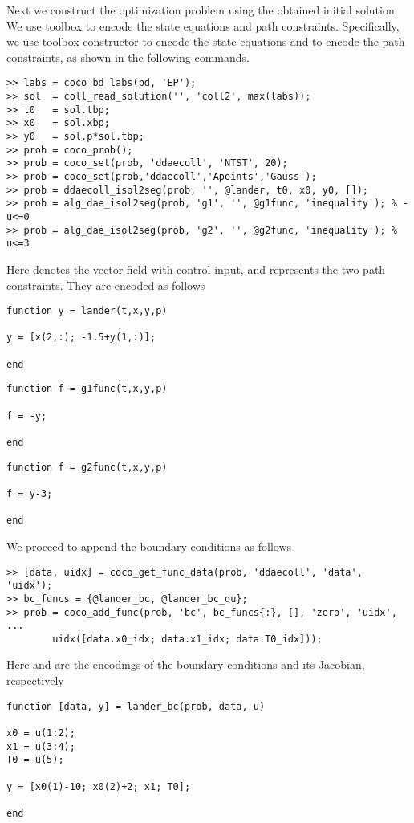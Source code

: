 Next we construct the optimization problem using the obtained initial solution. We use  toolbox to encode the state equations and path constraints. Specifically, we use  toolbox constructor to encode the state equations and  to encode the path constraints, as shown in the following commands.
\begin{lstlisting}[language=coco-highlight]
>> labs = coco_bd_labs(bd, 'EP');
>> sol  = coll_read_solution('', 'coll2', max(labs));
>> t0   = sol.tbp;
>> x0   = sol.xbp;
>> y0   = sol.p*sol.tbp;
>> prob = coco_prob();
>> prob = coco_set(prob, 'ddaecoll', 'NTST', 20);
>> prob = coco_set(prob,'ddaecoll','Apoints','Gauss');
>> prob = ddaecoll_isol2seg(prob, '', @lander, t0, x0, y0, []); 
>> prob = alg_dae_isol2seg(prob, 'g1', '', @g1func, 'inequality'); % -u<=0
>> prob = alg_dae_isol2seg(prob, 'g2', '', @g2func, 'inequality'); % u<=3
\end{lstlisting}
Here  denotes the vector field with control input,  and  represents the two path constraints. They are encoded as follows
\begin{lstlisting}[language=coco-highlight]
function y = lander(t,x,y,p)

y = [x(2,:); -1.5+y(1,:)];

end
\end{lstlisting}
\begin{lstlisting}[language=coco-highlight]
function f = g1func(t,x,y,p)

f = -y;

end
\end{lstlisting}
\begin{lstlisting}[language=coco-highlight]
function f = g2func(t,x,y,p)

f = y-3;

end
\end{lstlisting}
We proceed to append the boundary conditions as follows
\begin{lstlisting}[language=coco-highlight]
>> [data, uidx] = coco_get_func_data(prob, 'ddaecoll', 'data', 'uidx');
>> bc_funcs = {@lander_bc, @lander_bc_du};
>> prob = coco_add_func(prob, 'bc', bc_funcs{:}, [], 'zero', 'uidx', ...
        uidx([data.x0_idx; data.x1_idx; data.T0_idx]));
\end{lstlisting}
Here  and  are the encodings of the boundary conditions and its Jacobian, respectively
\begin{lstlisting}[language=coco-highlight]
function [data, y] = lander_bc(prob, data, u)

x0 = u(1:2);
x1 = u(3:4);
T0 = u(5);

y = [x0(1)-10; x0(2)+2; x1; T0];

end
\end{lstlisting}
